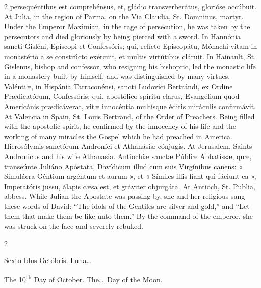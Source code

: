 \begin{paracol}{2}
 persequéntibus est comprehénsus, et, gládio transverberátus, glorióse 
 occúbuit.
\switchcolumn
{}
At Julia, in the region of Parma, on 
 the Via Claudia, St. Domninus, martyr. Under the Emperor Maximian, in 
 the rage of persecution, he was taken by the persecutors and died gloriously 
 by being pierced with a sword.
\switchcolumn*
{}
In Hannónia sancti 
 Gisléni, Epíscopi et Confessóris; qui, relícto Episcopátu, Mónachi vitam in 
 monastério a se constrúcto exércuit, et multis virtútibus cláruit.
\switchcolumn
{}
In Hainault, St. Gislenus, bishop 
 and confessor, who resigning his bishopric, led the monastic life in a 
 monastery built by himself, and was distinguished by many virtues.
\switchcolumn*
{}
Valéntiæ, in Hispánia 
 Tarraconénsi, sancti Ludovíci Bertrándi, ex Ordine Prædicatórum, Confessóris; 
 qui, apostólico spíritu clarus, Evangélium quod Americánis prædicáverat, 
 vitæ innocéntia multísque éditis miráculis confirmávit.
\switchcolumn
{}
At Valencia in Spain, St. Louis 
 Bertrand, of the Order of Preachers. Being filled with the apostolic 
 spirit, he confirmed by the innocency of his life and the working of many 
 miracles the Gospel which he had preached in America.
\switchcolumn*
{}
Hierosólymis sanctórum 
 Androníci et Athanásiæ cónjugis.
\switchcolumn
{}
At Jerusalem, Saints Andronicus and 
 his wife Athanasia.
\switchcolumn*
{}
Antiochíæ sanctæ Públiæ 
 Abbatíssæ, quæ, transeúnte Juliáno Apóstata, Davídicum illud cum suis 
 Virgínibus canens: « Simulácra Géntium argéntum et aurum », et « Símiles 
 illis fiant qui fáciunt ea », Imperatóris jussu, álapis cæsa est, et 
 gráviter objurgáta.
\switchcolumn
{}
At Antioch, St. Publia, abbess. 
 While Julian the Apostate was passing by, she and her religious sang these 
 words of David: ``The idols of the Gentiles are silver and gold,'' and ``Let 
 them that make them be like unto them.'' By the command of the emperor, 
 she was struck on the face and severely rebuked.
\switchcolumn*
{}
\end{paracol}


\begin{paracol}{2}
\begin{center}{\color{gregoriocolor} Sexto Idus Octóbris. 
 Luna\dots\ }\end{center}
\switchcolumn
{}
\begin{center}{\color{gregoriocolor} The   10\textsuperscript{th} Day of 
 October. The\dots\ Day of the Moon.}\end{center}
\end{paracol}

